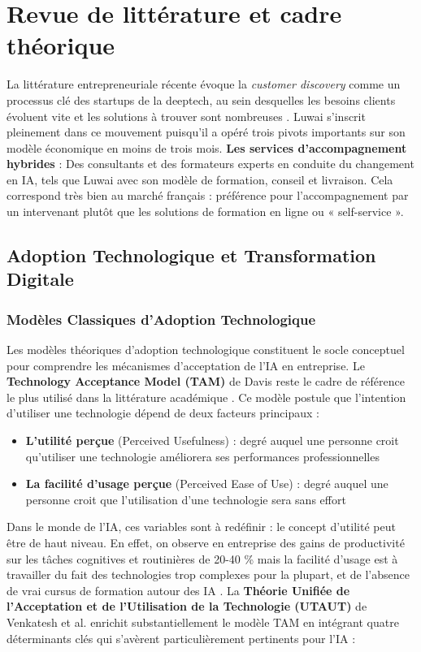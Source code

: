 \chapter{Revue de littérature et cadre théorique}
\label{chap:literature_review}

La littérature entrepreneuriale récente évoque la \textit{customer discovery} comme un processus clé des startups de la deeptech, au sein desquelles les besoins clients évoluent vite et les solutions à trouver sont nombreuses \cite{blank2013startup, osterwalder2014value}. Luwai s'inscrit pleinement dans ce mouvement puisqu'il a opéré trois pivots importants sur son modèle économique en moins de trois mois. \textbf{Les services d'accompagnement hybrides} : Des consultants et des formateurs experts en conduite du changement en IA, tels que Luwai avec son modèle de formation, conseil et livraison. Cela correspond très bien au marché français : préférence pour l'accompagnement par un intervenant plutôt que les solutions de formation en ligne ou « self-service ».

\section{Adoption Technologique et Transformation Digitale}

\subsection{Modèles Classiques d'Adoption Technologique}

Les modèles théoriques d'adoption technologique constituent le socle conceptuel pour comprendre les mécanismes d'acceptation de l'IA en entreprise. Le \textbf{Technology Acceptance Model (TAM)} de Davis \cite{davis1989perceived} reste le cadre de référence le plus utilisé dans la littérature académique \cite{artimon2025theorie}. Ce modèle postule que l'intention d'utiliser une technologie dépend de deux facteurs principaux :
\medskip
\begin{itemize}
    \item \textbf{L'utilité perçue} (Perceived Usefulness) : degré auquel une personne croit qu'utiliser une technologie améliorera ses performances professionnelles
    \item \textbf{La facilité d'usage perçue} (Perceived Ease of Use) : degré auquel une personne croit que l'utilisation d'une technologie sera sans effort
\end{itemize}
\medskip
Dans le monde de l’IA, ces variables sont à redéfinir : le concept d’utilité peut être de haut niveau. En effet, on observe en entreprise des gains de productivité sur les tâches cognitives et routinières de 20-40 \% mais la facilité d’usage est à travailler du fait des technologies trop complexes pour la plupart, et de l’absence de vrai cursus de formation autour des IA \cite{psicosmart2024resistance}.
\newpage
La \textbf{Théorie Unifiée de l'Acceptation et de l'Utilisation de la Technologie (UTAUT)} de Venkatesh et al. \cite{venkatesh2003user} enrichit substantiellement le modèle TAM en intégrant quatre déterminants clés qui s'avèrent particulièrement pertinents pour l'IA :

